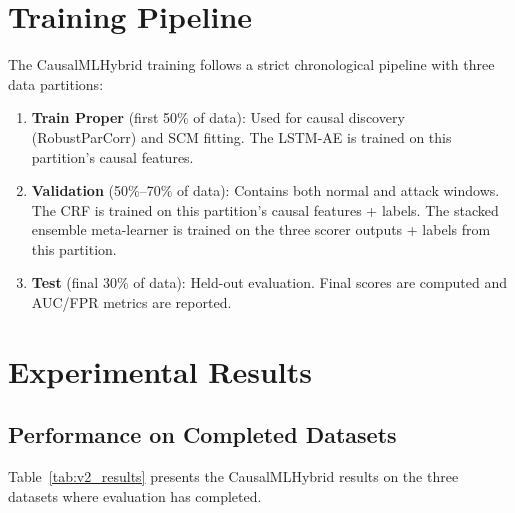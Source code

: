 \section{Training Pipeline}

The CausalMLHybrid training follows a strict chronological pipeline with three data partitions:

\begin{enumerate}
\item \textbf{Train Proper} (first 50\% of data): Used for causal discovery (RobustParCorr) and SCM fitting. The LSTM-AE is trained on this partition's causal features.

\item \textbf{Validation} (50\%--70\% of data): Contains both normal and attack windows. The CRF is trained on this partition's causal features + labels. The stacked ensemble meta-learner is trained on the three scorer outputs + labels from this partition.

\item \textbf{Test} (final 30\% of data): Held-out evaluation. Final scores are computed and AUC/FPR metrics are reported.
\end{enumerate}


\section{Experimental Results}

\subsection{Performance on Completed Datasets}

Table~\ref{tab:v2_results} presents the CausalMLHybrid results on the three datasets where evaluation has completed.

